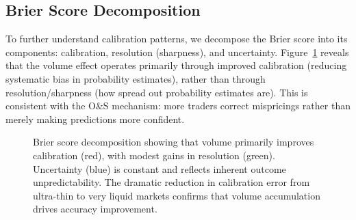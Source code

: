\documentclass[12pt,letterpaper]{article}
\begin{document}
\subsection{Brier Score Decomposition}

To further understand calibration patterns, we decompose the Brier score into its components: calibration, resolution (sharpness), and uncertainty. Figure~\ref{fig:brier-decomp} reveals that the volume effect operates primarily through improved calibration (reducing systematic bias in probability estimates), rather than through resolution/sharpness (how spread out probability estimates are). This is consistent with the O\&S mechanism: more traders correct mispricings rather than merely making predictions more confident.

\begin{figure}[ht]
\centering
{}
\caption{Brier score decomposition showing that volume primarily improves calibration (red), with modest gains in resolution (green). Uncertainty (blue) is constant and reflects inherent outcome unpredictability. The dramatic reduction in calibration error from ultra-thin to very liquid markets confirms that volume accumulation drives accuracy improvement.}
\label{fig:brier-decomp}
\end{figure}
\end{document}
